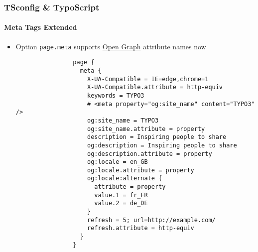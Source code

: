 \begin{frame}[fragile]
	\frametitle{TSconfig \& TypoScript}
	\framesubtitle{Meta Tags Extended}

	\lstset{basicstyle=\tiny\ttfamily}

	\begin{itemize}


		\item Option \texttt{page.meta} supports \href{http://ogp.me}{Open Graph} attribute names now

			\begin{lstlisting}
				page {
				  meta {
				    X-UA-Compatible = IE=edge,chrome=1
				    X-UA-Compatible.attribute = http-equiv
				    keywords = TYPO3
				    # <meta property="og:site_name" content="TYPO3" />
				    og:site_name = TYPO3
				    og:site_name.attribute = property
				    description = Inspiring people to share
				    og:description = Inspiring people to share
				    og:description.attribute = property
				    og:locale = en_GB
				    og:locale.attribute = property
				    og:locale:alternate {
				      attribute = property
				      value.1 = fr_FR
				      value.2 = de_DE
				    }
				    refresh = 5; url=http://example.com/
				    refresh.attribute = http-equiv
				  }
				}
			\end{lstlisting}

	\end{itemize}

\end{frame}


